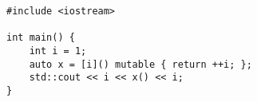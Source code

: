 \begin{lstlisting}[title=\href{https://godbolt.org/z/Gs995r}{\texttt{godbolt.org/z/Gs995r}}]
#include <iostream>

int main() {
    int i = 1;
    auto x = [i]() mutable { return ++i; };
    std::cout << i << x() << i;
}
\end{lstlisting}
